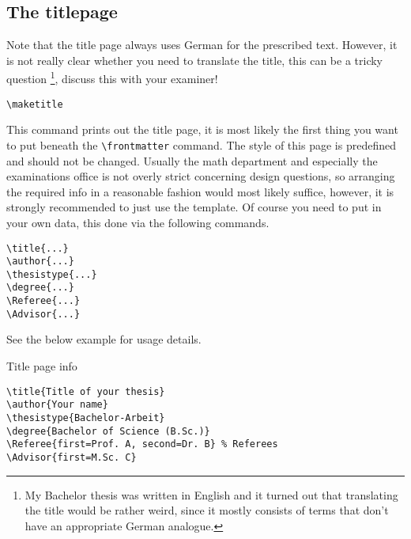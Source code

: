 \subsection{The titlepage} 
Note that the title page always uses German for the prescribed text. 
However, it is not 
really clear whether you need to translate the title, this can be a tricky question
\footnote{My Bachelor thesis was written in English and it turned out that translating 
the title would be rather weird, since it mostly consists of terms that don't have an 
appropriate German analogue.}, discuss this with your examiner!
\begin{emphBox}
\lstinline|\maketitle|
\end{emphBox}
This command prints out the title page, it is most likely the first thing you want to put 
beneath the \lstinline|\frontmatter| command. The style of this page is predefined and 
should not be changed. Usually the math department and especially the examinations 
office is not overly strict concerning design questions, so arranging the required 
info in a reasonable fashion would most likely suffice, however, it is strongly 
recommended to just use the template. Of course you need to put in your own data, this 
done via the following commands.
\begin{emphBox}
\lstinline|\title{...}|\\
\lstinline|\author{...}|\\
\lstinline|\thesistype{...}|\\
\lstinline|\degree{...}|\\
\lstinline|\Referee{...}|\\
\lstinline|\Advisor{...}|\\
\end{emphBox}
See the below example for usage details.
\begin{example}{Title page info}{}
\begin{lstlisting}
\title{Title of your thesis}
\author{Your name}
\thesistype{Bachelor-Arbeit}
\degree{Bachelor of Science (B.Sc.)}
\Referee{first=Prof. A, second=Dr. B} % Referees
\Advisor{first=M.Sc. C}
\end{lstlisting}
\end{example}
